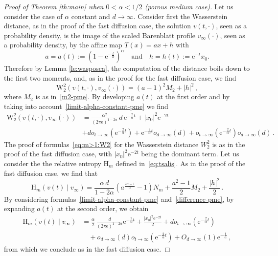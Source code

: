 \documentclass[10pt,reqno]{amsart}
\numberwithin{equation}{section}
\begin{document}
\begin{proof}[Proof of Theorem \ref{th:main} when $0<\alpha<1/2$ (porous medium case)]
Let us consider the case of $\alpha$ constant and $d\rightarrow\infty$. Consider first the Wasserstein distance, as in the proof of the fast diffusion case, the solution $v(t,\cdot)$, seen as a probability density, is the image of the scaled Barenblatt profile $v_\infty(\cdot)$, seen as a probability density, by the affine map $T(x)=ax+h$ with 
\begin{equation}
    a=a(t):=(1-\mathrm{e}^{-\frac{t}{\alpha}})^\alpha
    \quad\text{and}\quad 
    h=h(t):=\mathrm{e}^{-t}x_0.
\end{equation}
Therefore by Lemma \ref{le:wasposca}, the computation of the distance boils down to the first two moments, and, as in the proof for the fast diffusion case, we find 
\begin{equation} \label{eq:W2_exact_mgeq1}
    \mathrm{W}_2^2(v(t,\cdot),v_\infty(\cdot))
    =(a-1)^2M_2+|h|^2\,,
\end{equation}
where $M_2$ is as in~\eqref{m2-pme}. By developing $a(t)$ at the first order and by taking into account~\eqref{limit-alpha-constant-pme} we find
\[
\begin{split}
\mathrm{W}_2^2(v(t,\cdot),v_\infty(\cdot))
    & = \frac{\alpha^2}{(2\pi\mathrm{e})^{1-2\alpha}}\, d\, \mathrm{e}^{-\frac{2}{\alpha}t} + |x_0|^2 \mathrm{e}^{-2t}  \\
    & + d o_{t\to\infty}(\mathrm{e}^{-\frac{2}{\alpha}t})  + \mathrm{e}^{-\frac{2}{\alpha}t}o_{d\to\infty}(d) + o_{t\to\infty}(\mathrm{e}^{-\frac{2}{\alpha}t})o_{d\to\infty}(d)\,.
\end{split}
\]
The proof of formulas~\eqref{eq:m>1:W2} for the Wasserstein distance $W_2^2$ is as in the proof of the fast diffusion case, with $|x_0|^2 \mathrm{e}^{-2t}$ being the dominant term. Let us consider the the relative entropy  $\mathrm{H}_m$ defined in~\eqref{eq:tsalis}.
As in the proof of the fast diffusion case, we find that
\[
\mathrm{H}_m(v(t)\mid v_\infty)= \frac{\alpha\,d}{1-2\alpha} \left(a^\frac{2\alpha-1}{\alpha}-1\right)N_m +\frac{a^2-1}{2}M_2 + \frac{|h|^2}{2}\,.
\]
By considering formulas~\eqref{limit-alpha-constant-pme} and~\eqref{difference-pme},  by expanding $a(t)$ at the second order, we obtain
\begin{equation*}
\begin{split}
     \mathrm{H}_m(v(t)\mid v_\infty)& =\frac{\alpha}{2}\,\frac{d}{(2\pi\mathrm{e})^{1-2\alpha}} \mathrm{e}^{-\frac{2}{\alpha}t} + \frac{|x_0|^2 \mathrm{e}^{-2t}}{2}+  do_{t\rightarrow\infty}(\mathrm{e}^{-\frac{2}{\alpha}t}) \\ 
     & \quad + o_{d\rightarrow\infty}(d)o_{t\rightarrow\infty}(\mathrm{e}^{-\frac{2}{\alpha}t})  + O_{d\to\infty}(1) \mathrm{e}^{-\frac{t}{\alpha}}\,,
\end{split}
\end{equation*}
from which we conclude as in the fast diffusion case. 


\end{proof}
\end{document}
